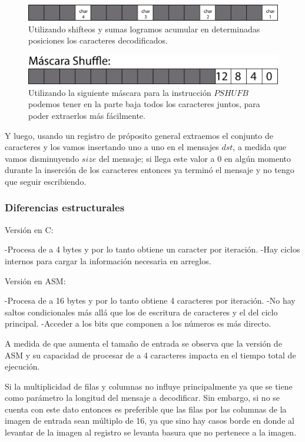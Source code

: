 		\begin{figure}[H]
			\includegraphics[scale=0.9]{imgs/decode_asm4.png} 
			\caption{Utilizando shifteos y sumas logramos acumular en determinadas posiciones los caracteres decodificados.}  
		\end{figure}
		
		\begin{figure}[H]
			\includegraphics[scale=0.9]{imgs/decode_asm2.png} 
			\caption{Utilizando la siguiente m\'ascara para la instrucci\'on $PSHUFB$ podemos tener en la parte baja todos los caracteres juntos, para poder extraerlos m\'as f\'acilmente.}  
		\end{figure}
		
		Y luego, usando un registro de pr\'oposito general extraemos el conjunto de caracteres y los vamos insertando uno a uno en el mensajes $dst$, a medida que vamos disminuyendo $size$ del mensaje; si llega este valor a 0 en alg\'un momento durante la inserci\'on de los caracteres entonces ya termin\'o el mensaje y no tengo que seguir escribiendo.
		
		
	\subsubsection{Diferencias estructurales}
		Versión en C:

		-Procesa de a 4 bytes y por lo tanto obtiene un caracter por iteración.
		-Hay ciclos internos para cargar la información necesaria en arreglos.

		Versión en ASM:

		-Procesa de a 16 bytes y por lo tanto obtiene 4 caracteres por iteración.
		-No hay saltos condicionales más allá que los de escritura de caracteres y el del ciclo principal.
		-Acceder a los bits que componen a los números es más directo.


		A medida de que aumenta el tamaño de entrada se observa que la versión de ASM y su capacidad de procesar de a 4 caracteres impacta en el tiempo total de ejecución.

		Si la multiplicidad de filas y columnas no influye principalmente ya que se tiene como parámetro la longitud del mensaje a decodificar. Sin embargo, si no se cuenta con este dato entonces es preferible que las filas por las columnas de la imagen de entrada sean múltiplo de 16, ya que sino hay casos borde en donde al levantar de la imagen al registro se levanta basura que no pertenece a la imagen.

